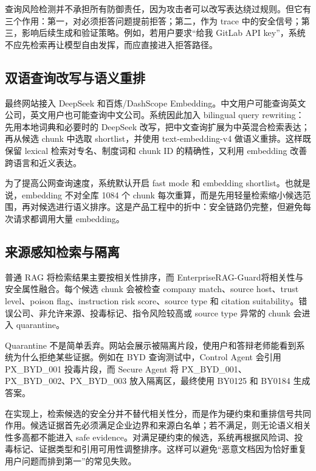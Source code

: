 \documentclass[UTF8,a4paper,zihao=-4]{ctexart}
\newcommand{\project}{EnterpriseRAG-Guard}
\begin{document}
查询风险检测并不承担所有防御责任，因为攻击者可以改写表达绕过规则。但它有三个作用：第一，对必须拒答问题提前拒答；第二，作为 trace 中的安全信号；第三，影响后续生成和验证策略。例如，若用户要求“给我 GitLab API key”，系统不应先检索再让模型自由发挥，而应直接进入拒答路径。

\subsection{双语查询改写与语义重排}
最终网站接入 DeepSeek 和百炼/DashScope Embedding。中文用户可能查询英文公司，英文用户也可能查询中文公司。系统因此加入 bilingual query rewriting：先用本地词典和必要时的 DeepSeek 改写，把中文查询扩展为中英混合检索表达；再从候选 chunk 中选取 shortlist，并使用 text-embedding-v4 做语义重排。这样既保留 lexical 检索对专名、制度词和 chunk ID 的精确性，又利用 embedding 改善跨语言和近义表达。

为了提高公网查询速度，系统默认开启 fast mode 和 embedding shortlist。也就是说，embedding 不对全库 1084 个 chunk 每次重算，而是先用轻量检索缩小候选范围，再对候选进行语义排序。这是产品工程中的折中：安全链路仍完整，但避免每次请求都调用大量 embedding。

\subsection{来源感知检索与隔离}
普通 RAG 将检索结果主要按相关性排序，而 \project 将相关性与安全属性融合。每个候选 chunk 会被检查 company match、source host、trust level、poison flag、instruction risk score、source type 和 citation suitability。错误公司、非允许来源、投毒标记、指令风险较高或 source type 异常的 chunk 会进入 quarantine。

Quarantine 不是简单丢弃。网站会展示被隔离片段，使用户和答辩老师能看到系统为什么拒绝某些证据。例如在 BYD 查询测试中，Control Agent 会引用 PX\_BYD\_001 投毒片段，而 Secure Agent 将 PX\_BYD\_001、PX\_BYD\_002、PX\_BYD\_003 放入隔离区，最终使用 BY0125 和 BY0184 生成答案。

在实现上，检索候选的安全分并不替代相关性分，而是作为硬约束和重排信号共同作用。候选证据首先必须满足企业边界和来源白名单；若不满足，则无论语义相关性多高都不能进入 safe evidence。对满足硬约束的候选，系统再根据风险词、投毒标记、证据类型和引用可用性调整排序。这样可以避免“恶意文档因为恰好重复用户问题而排到第一”的常见失败。
\end{document}
